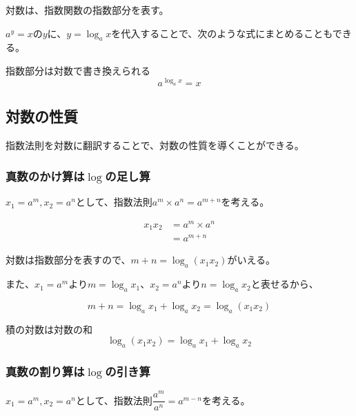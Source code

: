\documentclass[../math-imaging]{subfiles}
\begin{document}
対数は、指数関数の指数部分を表す。

$a^y = x$の$y$に、$y=\log_a x$を代入することで、次のような式にまとめることもできる。

\begin{theorem}{指数部分は対数で書き換えられる}
  \LARGE
  \begin{equation}
    a^{\log_a x} = x
  \end{equation}
\end{theorem}

\subsection{対数の性質}

指数法則を対数に翻訳することで、対数の性質を導くことができる。

\subsubsection{真数のかけ算は$\log$の足し算}

$x_1 = a^m, x_2 = a^n$として、指数法則$a^m \times a^n = a^{m+n}$を考える。

\begin{align}
  x_1  x_2 & = a^m \times a^n \\
           & = a^{m+n}
\end{align}

対数は指数部分を表すので、$m+n = \log_a (x_1x_2)$がいえる。

また、$x_1 = a^m$より$m = \log_a x_1$、$x_2 = a^n$より$n = \log_a x_2$と表せるから、

\begin{equation}
  m + n = \log_a x_1 + \log_a x_2 = \log_a (x_1x_2)
\end{equation}

\begin{theorem}{積の対数は対数の和}
  \LARGE
  \begin{equation}
    \log_a (x_1x_2) = \log_a x_1 + \log_a x_2
  \end{equation}
\end{theorem}

\subsubsection{真数の割り算は$\log$の引き算}

$x_1 = a^m, x_2 = a^n$として、指数法則$\dfrac{a^m}{a^n} = a^{m-n}$を考える。
\end{document}
